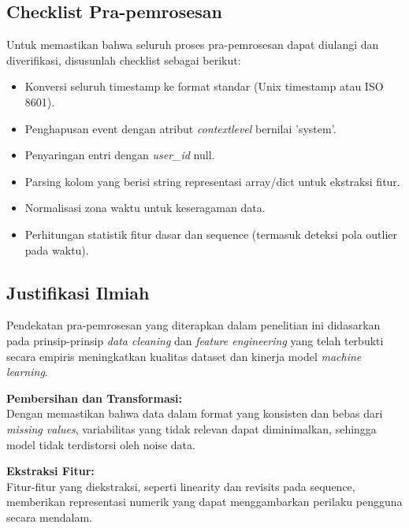 
\subsection{Checklist Pra-pemrosesan}
\label{sec:checklistPraPemrosesan}
Untuk memastikan bahwa seluruh proses pra-pemrosesan dapat diulangi dan diverifikasi, disusunlah checklist sebagai berikut:
\begin{itemize}
    \item Konversi seluruh timestamp ke format standar (Unix timestamp atau ISO 8601).
    \item Penghapusan event dengan atribut \textit{contextlevel} bernilai 'system'.
    \item Penyaringan entri dengan \textit{user\_id} null.
    \item Parsing kolom yang berisi string representasi array/dict untuk ekstraksi fitur.
    \item Normalisasi zona waktu untuk keseragaman data.
    \item Perhitungan statistik fitur dasar dan sequence (termasuk deteksi pola outlier pada waktu).
\end{itemize}

\subsection{Justifikasi Ilmiah}
\label{sec:justifikasiIlmiah}
Pendekatan pra-pemrosesan yang diterapkan dalam penelitian ini didasarkan pada prinsip-prinsip \textit{data cleaning} dan \textit{feature engineering} yang telah terbukti secara empiris meningkatkan kualitas dataset dan kinerja model \textit{machine learning}.

\textbf{Pembersihan dan Transformasi:} \\
Dengan memastikan bahwa data dalam format yang konsisten dan bebas dari \textit{missing values}, variabilitas yang tidak relevan dapat diminimalkan, sehingga model tidak terdistorsi oleh noise data.

\textbf{Ekstraksi Fitur:} \\
Fitur-fitur yang diekstraksi, seperti linearity dan revisits pada sequence, memberikan representasi numerik yang dapat menggambarkan perilaku pengguna secara mendalam.

